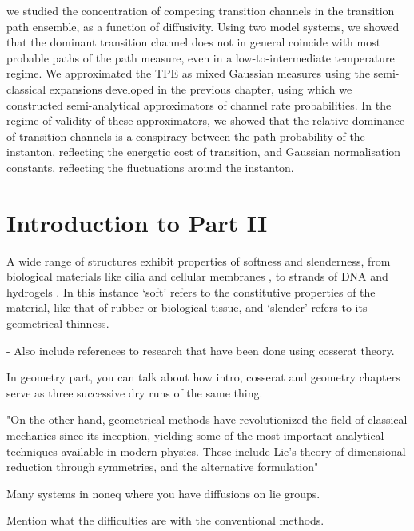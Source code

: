 \documentclass[]{cam-thesis}
\begin{document}
we studied the concentration of competing transition channels in the transition path ensemble, as a function of diffusivity. Using two model systems, we showed that the dominant transition channel does not in general coincide with most probable paths of the path measure, even in a low-to-intermediate temperature regime. We approximated the TPE as mixed Gaussian measures using the semi-classical expansions developed in the previous chapter, using which we constructed semi-analytical approximators of channel rate probabilities. In the regime of validity of these approximators, we showed that the relative dominance of transition channels is a conspiracy between the path-probability of the instanton, reflecting the energetic cost of transition, and Gaussian normalisation constants, reflecting the fluctuations around the instanton.





\section*{Introduction to Part II}

A wide range of structures exhibit properties of softness and slenderness, from biological materials like cilia \citep{guMagneticCiliaCarpets2020} and cellular membranes \citep{krishnaswamyCosserattypeModelRed1996}, to strands of DNA \citep{corazzaUnravelingLoopingEfficiency2022} and hydrogels \citep{rajanMechanicsViscoelasticBuckling2019}. In this instance `soft' refers to the constitutive properties of the material, like that of rubber or biological tissue, and `slender' refers to its geometrical thinness.

- Also include references to research that have been done using cosserat theory.



In geometry part, you can talk about how intro, cosserat and geometry chapters serve as three successive dry runs of the same thing.

"On the other hand, geometrical methods have revolutionized the field of classical
mechanics since its inception, yielding some of the most important analytical techniques
available in modern physics. These include Lie’s theory of dimensional reduction through
symmetries, and the alternative formulation"



Many systems in noneq where you have diffusions on lie groups.

Mention what the difficulties are with the conventional methods.
\end{document}

